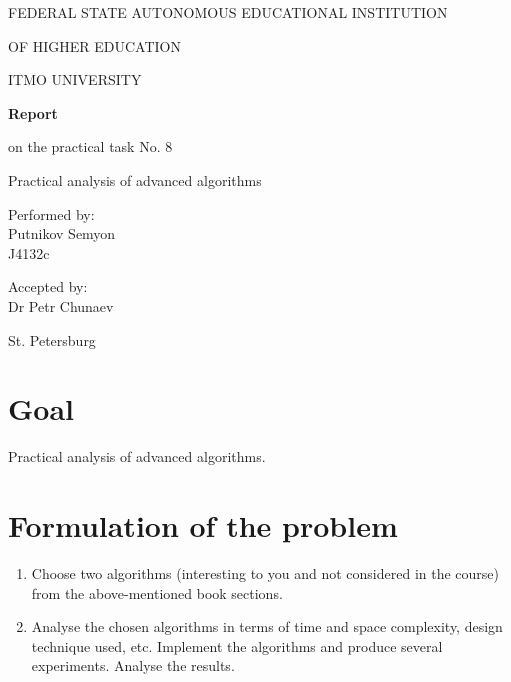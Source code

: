 \documentclass[a4paper,article,14pt]{extarticle}
\begin{document}
	\begin{titlepage}
		\begin{center}
			FEDERAL STATE AUTONOMOUS EDUCATIONAL INSTITUTION
			
			OF HIGHER EDUCATION
			
			ITMO UNIVERSITY
			\vspace{3cm}
			
			\large\textbf{Report}
			
			\large on the practical task No. 8
			
			\large \flqq Practical analysis of advanced algorithms \frqq
			\vspace{5cm}
			

			\begin{flushright}
				{Performed by:} \\
				Putnikov Semyon \\ 
				J4132c \\
			\end{flushright}
			
			
			\begin{flushright}
				{Accepted by:} \\
				Dr Petr Chunaev \\ 
			\end{flushright}
			\vfill
			
			{St. Petersburg}
			\par{\number\year}
		\end{center}
	\end{titlepage}

	\newpage
	
	\section{Goal}
	Practical analysis of advanced algorithms.
	
	\section{Formulation of the problem}
	\begin{enumerate}[label=\Roman*]
		\item Choose two algorithms (interesting to you and not considered in the course) from the above-mentioned book sections.
		\item Analyse the chosen algorithms in terms of time and space complexity, design technique used, etc. Implement the algorithms and produce several experiments. Analyse the results.
	\end{enumerate}
\end{document}
